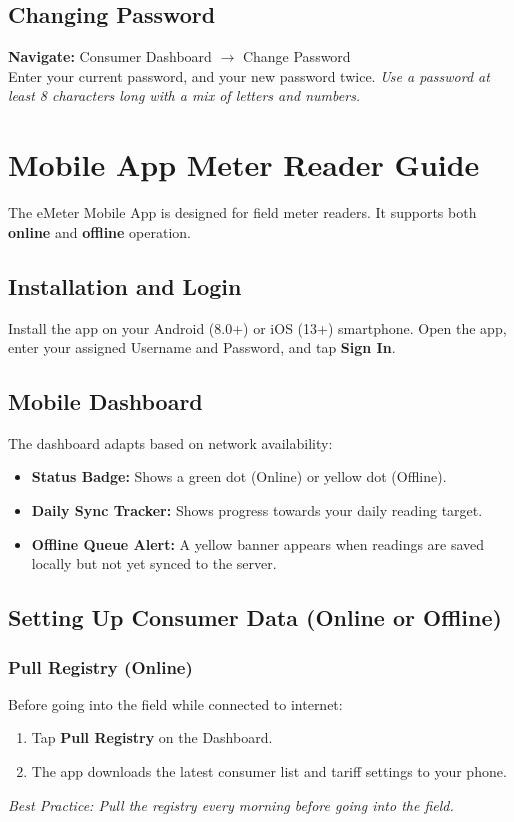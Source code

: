 \documentclass[12pt, a4paper]{report}
\begin{document}
\section{Changing Password}
\textbf{Navigate:} Consumer Dashboard $\rightarrow$ Change Password\\
Enter your current password, and your new password twice. 
\textit{Use a password at least 8 characters long with a mix of letters and numbers.}

\chapter{Mobile App Meter Reader Guide}

The eMeter Mobile App is designed for field meter readers. It supports both \textbf{online} and \textbf{offline} operation.

\section{Installation and Login}
Install the app on your Android (8.0+) or iOS (13+) smartphone. Open the app, enter your assigned Username and Password, and tap \textbf{Sign In}.

\section{Mobile Dashboard}
The dashboard adapts based on network availability:
\begin{itemize}
    \item \textbf{Status Badge:} Shows a green dot (Online) or yellow dot (Offline).
    \item \textbf{Daily Sync Tracker:} Shows progress towards your daily reading target.
    \item \textbf{Offline Queue Alert:} A yellow banner appears when readings are saved locally but not yet synced to the server.
\end{itemize}

\section{Setting Up Consumer Data (Online or Offline)}

\subsection{Pull Registry (Online)}
Before going into the field while connected to internet:
\begin{enumerate}
    \item Tap \textbf{Pull Registry} on the Dashboard.
    \item The app downloads the latest consumer list and tariff settings to your phone.
\end{enumerate}
\textit{Best Practice: Pull the registry every morning before going into the field.}
\end{document}
